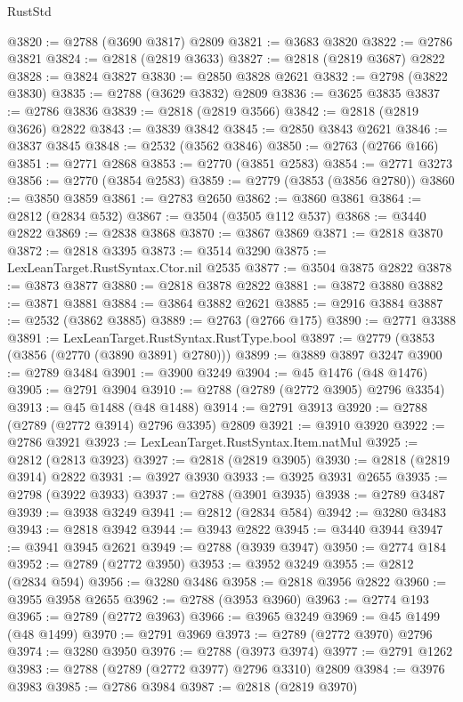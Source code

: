 \begin{lexlean}{RustStd}
\begin{coremodule}
@3820 := @2788 (@3690 @3817) @2809
@3821 := @3683 @3820
@3822 := @2786 @3821
@3824 := @2818 (@2819 @3633)
@3827 := @2818 (@2819 @3687) @2822
@3828 := @3824 @3827
@3830 := @2850 @3828 @2621
@3832 := @2798 (@3822 @3830)
@3835 := @2788 (@3629 @3832) @2809
@3836 := @3625 @3835
@3837 := @2786 @3836
@3839 := @2818 (@2819 @3566)
@3842 := @2818 (@2819 @3626) @2822
@3843 := @3839 @3842
@3845 := @2850 @3843 @2621
@3846 := @3837 @3845
@3848 := @2532 (@3562 @3846)
@3850 := @2763 (@2766 @166)
@3851 := @2771 @2868
@3853 := @2770 (@3851 @2583)
@3854 := @2771 @3273
@3856 := @2770 (@3854 @2583)
@3859 := @2779 (@3853 (@3856 @2780))
@3860 := @3850 @3859
@3861 := @2783 @2650
@3862 := @3860 @3861
@3864 := @2812 (@2834 @532)
@3867 := @3504 (@3505 @112 @537)
@3868 := @3440 @2822
@3869 := @2838 @3868
@3870 := @3867 @3869
@3871 := @2818 @3870
@3872 := @2818 @3395
@3873 := @3514 @3290
@3875 := LexLeanTarget.RustSyntax.Ctor.nil @2535
@3877 := @3504 @3875 @2822
@3878 := @3873 @3877
@3880 := @2818 @3878 @2822
@3881 := @3872 @3880
@3882 := @3871 @3881
@3884 := @3864 @3882 @2621
@3885 := @2916 @3884
@3887 := @2532 (@3862 @3885)
@3889 := @2763 (@2766 @175)
@3890 := @2771 @3388
@3891 := LexLeanTarget.RustSyntax.RustType.bool
@3897 := @2779 (@3853 (@3856 (@2770 (@3890 @3891) @2780)))
@3899 := @3889 @3897 @3247
@3900 := @2789 @3484
@3901 := @3900 @3249
@3904 := @45 @1476 (@48 @1476)
@3905 := @2791 @3904
@3910 := @2788 (@2789 (@2772 @3905) @2796 @3354)
@3913 := @45 @1488 (@48 @1488)
@3914 := @2791 @3913
@3920 := @2788 (@2789 (@2772 @3914) @2796 @3395) @2809
@3921 := @3910 @3920
@3922 := @2786 @3921
@3923 := LexLeanTarget.RustSyntax.Item.natMul
@3925 := @2812 (@2813 @3923)
@3927 := @2818 (@2819 @3905)
@3930 := @2818 (@2819 @3914) @2822
@3931 := @3927 @3930
@3933 := @3925 @3931 @2655
@3935 := @2798 (@3922 @3933)
@3937 := @2788 (@3901 @3935)
@3938 := @2789 @3487
@3939 := @3938 @3249
@3941 := @2812 (@2834 @584)
@3942 := @3280 @3483
@3943 := @2818 @3942
@3944 := @3943 @2822
@3945 := @3440 @3944
@3947 := @3941 @3945 @2621
@3949 := @2788 (@3939 @3947)
@3950 := @2774 @184
@3952 := @2789 (@2772 @3950)
@3953 := @3952 @3249
@3955 := @2812 (@2834 @594)
@3956 := @3280 @3486
@3958 := @2818 @3956 @2822
@3960 := @3955 @3958 @2655
@3962 := @2788 (@3953 @3960)
@3963 := @2774 @193
@3965 := @2789 (@2772 @3963)
@3966 := @3965 @3249
@3969 := @45 @1499 (@48 @1499)
@3970 := @2791 @3969
@3973 := @2789 (@2772 @3970) @2796
@3974 := @3280 @3950
@3976 := @2788 (@3973 @3974)
@3977 := @2791 @1262
@3983 := @2788 (@2789 (@2772 @3977) @2796 @3310) @2809
@3984 := @3976 @3983
@3985 := @2786 @3984
@3987 := @2818 (@2819 @3970)

\end{coremodule}
\end{lexlean}
